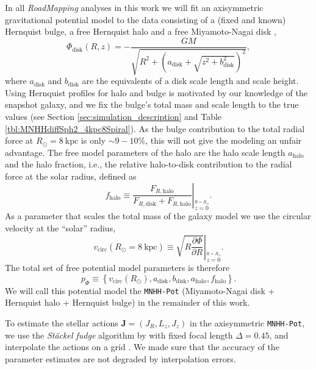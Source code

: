 \documentclass[iop,revtex4,numberedappendix,appendixfloats]{emulateapj}
\newcommand{\vect}[1]{\boldsymbol{#1}}
\newcommand{\RM}{{\sl RoadMapping}}
\begin{document}
In all \RM{} analyses in this work we will fit an axisymmetric gravitational potential model to the data consisting of a (fixed and known) Hernquist bulge, a free Hernquist halo and a free Miyamoto-Nagai disk \citep{1975PASJ...27..533M},
\begin{equation}
\Phi_\text{disk}(R,z) = - \frac{GM}{\sqrt{R^2+(a_\text{disk}+\sqrt{z^2+b_\text{disk}^2})^2}}, \label{eq:MN-disk}
\end{equation}
where $a_\text{disk}$ and $b_\text{disk}$ are the equivalents of a disk scale length and scale height. Using Hernquist profiles for halo and bulge is motivated by our knowledge of the snapshot galaxy, and we fix the bulge's total mass and scale length to the true values (see Section \ref{sec:simulation_description} and Table \ref{tbl:MNHHdiffSph2_4kpc8Spiral}). As the bulge contribution to the total radial force at $R_\odot=8~\text{kpc}$ is only $\sim9-10\%$, this will not give the modeling an unfair advantage. The free model parameters of the halo are the halo scale length $a_\text{halo}$ and the halo fraction, i.e., the relative halo-to-disk contribution to the radial force at the solar radius, defined as
\begin{equation}
f_\text{halo} \equiv \left. \frac{F_{R,\text{halo}}}{F_{R,\text{disk}} + F_{R,\text{halo}}} \right|_{\stackrel{R=R_\odot}{z=0}}.\label{eq:fhalo}
\end{equation}
As a parameter that scales the total mass of the galaxy model we use the circular velocity at the ``solar'' radius,
\begin{equation}
v_\text{circ}(R_\odot=8~\text{kpc}) \equiv \left. \sqrt{ R \frac{\partial \Phi}{\partial R} }\right|_{\stackrel{R=R_\odot}{z=0}} . \label{eq:circvel}
\end{equation}  
The total set of free potential model parameters is therefore
\begin{equation}
p_\Phi \equiv \left\{ v_\text{circ}(R_\odot),a_\text{disk},b_\text{disk},a_\text{halo},f_\text{halo}\right\}.
\end{equation} 
We will call this potential model the \texttt{MNHH-Pot} (Miyamoto-Nagai disk + Hernquist halo + Hernquist bulge) in the remainder of this work.

To estimate the stellar actions $\vect{J}=(J_R,L_z,J_z)$ in the axisymmetric \texttt{MNHH-Pot}, we use the \emph{St\"{a}ckel fudge} algorithm by \citet{2012MNRAS.426.1324B} with fixed focal length $\Delta=0.45$, and interpolate the actions on a grid \citep{2012MNRAS.426.1324B,2015ApJS..216...29B}. We made sure that the accuracy of the parameter estimates are not degraded by interpolation errors.
\end{document}
